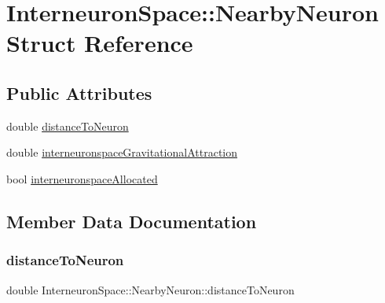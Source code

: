 \hypertarget{structInterneuronSpace_1_1NearbyNeuron}{}\section{Interneuron\+Space\+:\+:Nearby\+Neuron Struct Reference}
\label{structInterneuronSpace_1_1NearbyNeuron}
\subsection*{Public Attributes}
\begin{DoxyCompactItemize}
\item 
double \mbox{\hyperlink{structInterneuronSpace_1_1NearbyNeuron_aac9b3036ebacb6c96c0cab20606bcbf2}{distance\+To\+Neuron}}
\item 
double \mbox{\hyperlink{structInterneuronSpace_1_1NearbyNeuron_a5cb224a1735249e1e50b934bdfd2ff3f}{interneuronspace\+Gravitational\+Attraction}}
\item 
bool \mbox{\hyperlink{structInterneuronSpace_1_1NearbyNeuron_ab003504638f28dfdc7f88a24727f72c9}{interneuronspace\+Allocated}}
\end{DoxyCompactItemize}


\subsection{Member Data Documentation}
\mbox{\label{structInterneuronSpace_1_1NearbyNeuron_aac9b3036ebacb6c96c0cab20606bcbf2}} 
\subsubsection{\texorpdfstring{distance\+To\+Neuron}{distanceToNeuron}}
{\footnotesize\ttfamily double Interneuron\+Space\+::\+Nearby\+Neuron\+::distance\+To\+Neuron}

\mbox{\label{structInterneuronSpace_1_1NearbyNeuron_ab003504638f28dfdc7f88a24727f72c9}} 
